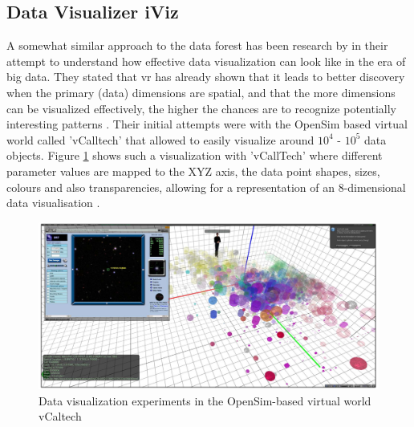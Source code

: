 
\subsection{Data Visualizer iViz}

A somewhat similar approach to the data forest has been research by \cite{Donalek2014} in their attempt to understand how effective data visualization can look like in the era of big data. They stated that \gls{vr} has already shown that it leads to better discovery when the primary (data) dimensions are spatial, and that the more dimensions can be visualized effectively, the higher the chances are to recognize potentially interesting patterns \citep{Donalek2014}. Their initial attempts were with the OpenSim based virtual world called 'vCalltech' that allowed \cite{Donalek2014} to easily visualize around $10^{4}$ - $10^{5}$ data objects. Figure \ref{fig:caltechsim} shows such a visualization with 'vCallTech' where different parameter values are mapped to the XYZ axis, the data point shapes, sizes, colours and also transparencies, allowing for a representation of an 8-dimensional data visualisation \citep{Donalek2014}.
\begin{figure}[h]
	\begin{center}
		\includegraphics[width=14cm]{03_Figures/05_LitReview/Donalek2014_Caltech.png}
		\caption[Data visualization experiments in the OpenSim-based virtual world vCaltech]{Data visualization experiments in the OpenSim-based virtual world vCaltech \citep{Donalek2014}}
		\label{fig:caltechsim}
	\end{center}
\end{figure}

